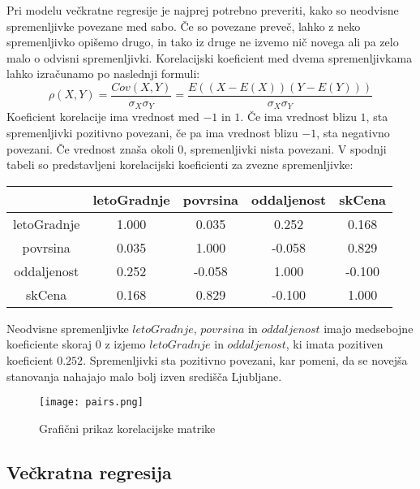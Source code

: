 \documentclass[a4paper, 12pt]{article}
\begin{document}
Pri modelu večkratne regresije je najprej potrebno preveriti, kako so
neodvisne spremenljivke povezane med sabo. Če so povezane preveč, lahko z neko
spremenljivko opišemo drugo, in tako iz druge ne izvemo nič novega ali pa zelo
malo o odvisni spremenljivki. Korelacijski koeficient med dvema spremenljivkama
lahko izračunamo po naslednji formuli:
\begin{equation}
	\rho\left(X,Y\right) = \frac{Cov\left(X,Y\right)}{\sigma_{X}\sigma_{Y}} =
	\frac{E\left(\left(X-E\left(X\right)\right)\left(Y-E\left(Y\right)\right)\right)}{\sigma_{X}\sigma_{Y}}
\end{equation}
Koeficient korelacije ima vrednost med $ -1 $ in $ 1 $. Če ima vrednost blizu
$ 1 $, sta spremenljivki pozitivno povezani, če pa ima vrednost blizu $ -1 $,
sta negativno povezani. Če vrednost znaša okoli $ 0 $, spremenljivki nista
povezani.
\newline
V spodnji tabeli so predstavljeni korelacijski koeficienti za zvezne
spremenljivke:
\begin{center}
\begin{tabular}{ c|cccc }
	& letoGradnje & povrsina & oddaljenost & skCena \\
	\hline
	letoGradnje & 1.000 & 0.035 & 0.252 & 0.168 \\
	povrsina & 0.035 & 1.000 & -0.058 & 0.829 \\
	oddaljenost & 0.252 & -0.058 & 1.000 & -0.100 \\
	skCena & 0.168 & 0.829 & -0.100 & 1.000 \\
\end{tabular}
\end{center}
Neodvisne spremenljivke $ letoGradnje $, $ povrsina $ in
$ oddaljenost $ imajo medsebojne koeficiente skoraj $ 0 $ z izjemo
$ letoGradnje $ in $ oddaljenost $, ki imata pozitiven koeficient
$ 0.252 $. Spremenljivki sta pozitivno povezani, kar pomeni, da se novejša
stanovanja nahajajo malo bolj izven središča Ljubljane.
\begin{figure}[H]
	\centering
	\texttt{[image: pairs.png]}
	\caption{Grafični prikaz korelacijske matrike}
\end{figure}

\subsection{Večkratna regresija}
\end{document}
